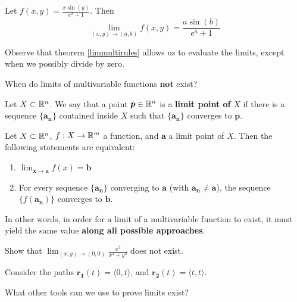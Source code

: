 \begin{example}
Let $f(x,y) = \frac{x\sin(y)}{e^x+1}$.  Then $$\lim_{(x,y) \to (a,b)}f(x,y) = \frac{a\sin(b)}{e^a+1}$$
\end{example}  
    
    Observe that theorem \ref{limmultirules} allows us to evaluate the limits, except when we possibly divide by zero.
    
  \begin{motivating}
  When do limits of multivariable functions \textbf{not} exist?
  \end{motivating}  
    
    \begin{definition}
    Let $X \subset \mathbb{R}^n$.  We say that a point $\bm{p} \in \mathbb{R}^n$ is a \textbf{limit point of} $X$ if there is a sequence $\{\bm{a_n}\}$ contained inside $X$ such that $\{\bm{a_n}\}$ converges to $\bm{p}$.    
    \end{definition}
        
    
    \begin{theorem}
     Let $X \subset \mathbb{R}^n$, $f : X \to \mathbb{R}^m$ a function, and $\bm{a}$ a limit point of $X$.  Then the following statements are equivalent:
     
     \begin{enumerate}
         \item $\lim_{\bm{x} \to \bm{a}}f(x) = \bm{b}$
         \item For every sequence $\{\bm{a_n}\}$ converging to $\bm{a}$ (with $\bm{a_n} \neq \bm{a}$), the sequence $\{f(\bm{a_n})\}$ converges to $\bm{b}$.
     \end{enumerate}
     
    \end{theorem}
    
    In other words, in order for a limit of a multivariable function to exist, it must yield the same value \textbf{along all possible approaches}.
    
    \begin{example}
    Show that $\lim_{(x,y) \to (0,0)} \frac{x^2}{x^2 + y^2}$ does not exist.
    
    Consider the paths $\bm{r_1}(t) = \langle 0, t \rangle$, and $\bm{r_2}(t) = \langle t, t \rangle$.
    \end{example}
    
    
    \begin{motivating}
        What other tools can we use to prove limits exist?
    \end{motivating}
    
